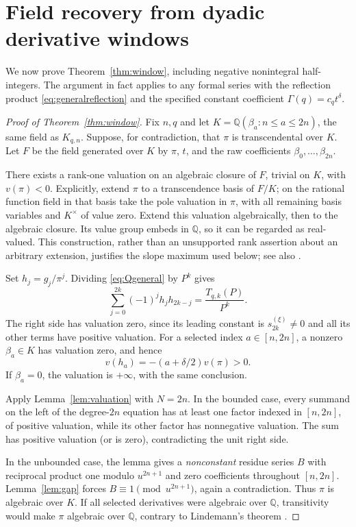 \documentclass[11pt,a4paper]{article}
\theoremstyle{definition}\newtheorem{definition}[theorem]{Definition}
\theoremstyle{remark}\newtheorem{remark}[theorem]{Remark}
\newcommand{\Q}{\mathbb Q}\newcommand{\Qb}{\overline{\mathbb Q}}
\begin{document}
\section{Field recovery from dyadic derivative windows}\label{sec:window}
We now prove Theorem~\ref{thm:window}, including negative nonintegral half-integers. The argument in fact applies to any formal series with the reflection product \eqref{eq:generalreflection} and the specified constant coefficient $\Gamma(q)=c_qt^\delta$.

\begin{proof}[Proof of Theorem~\ref{thm:window}]
Fix $n,q$ and let $K=\Q(\beta_a:n\le a\le2n)$, the same field as $K_{q,n}$. Suppose, for contradiction, that $\pi$ is transcendental over $K$. Let $F$ be the field generated over $K$ by $\pi$, $t$, and the raw coefficients $\beta_0,\ldots,\beta_{2n}$.

There exists a rank-one valuation on an algebraic closure of $F$, trivial on $K$, with $v(\pi)<0$. Explicitly, extend $\pi$ to a transcendence basis of $F/K$; on the rational function field in that basis take the pole valuation in $\pi$, with all remaining basis variables and $K^\times$ of value zero. Extend this valuation algebraically, then to the algebraic closure. Its value group embeds in $\Q$, so it can be regarded as real-valued. This construction, rather than an unsupported rank assertion about an arbitrary extension, justifies the slope maximum used below; see also \cite{Valued}.

Set $h_j=g_j/\pi^j$. Dividing \eqref{eq:Qgeneral} by $P^k$ gives
\begin{equation}\label{eq:normalizedQ}
\sum_{j=0}^{2k}(-1)^jh_jh_{2k-j}=
\frac{T_{q,k}(P)}{P^k}.
\end{equation}
The right side has valuation zero, since its leading constant is $s_{2k}^{(\xi)}\ne0$ and all its other terms have positive valuation. For a selected index $a\in[n,2n]$, a nonzero $\beta_a\in K$ has valuation zero, and hence
\[
v(h_a)=-(a+\delta/2)v(\pi)>0.
\]
If $\beta_a=0$, the valuation is $+\infty$, with the same conclusion.

Apply Lemma~\ref{lem:valuation} with $N=2n$. In the bounded case, every summand on the left of the degree-$2n$ equation has at least one factor indexed in $[n,2n]$, of positive valuation, while its other factor has nonnegative valuation. The sum has positive valuation (or is zero), contradicting the unit right side.

In the unbounded case, the lemma gives a \emph{nonconstant} residue series $B$ with reciprocal product one modulo $u^{2n+1}$ and zero coefficients throughout $[n,2n]$. Lemma~\ref{lem:gap} forces $B\equiv1\pmod{u^{2n+1}}$, again a contradiction. Thus $\pi$ is algebraic over $K$. If all selected derivatives were algebraic over $\Q$, transitivity would make $\pi$ algebraic over $\Q$, contrary to Lindemann's theorem \cite{Lindemann}.
\end{proof}
\end{document}
